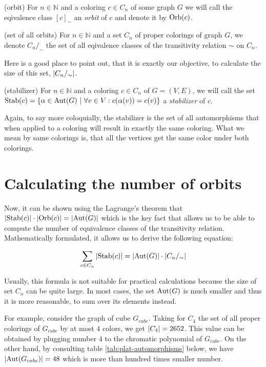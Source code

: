 \begin{defn}(orbit)
    For $n \in \mathbb{N}$ and a coloring $c \in C_n$ of some graph $G$ we will call the eqivalence class $[c]_{\sim}$ an \emph{orbit} of $c$ and denote it by $\operatorname{Orb}(c)$.
\end{defn}

\begin{defn}(set of all orbits)
    For $n \in \mathbb{N}$ and a set $C_n$ of proper colorings of graph $G$, we denote $C_n/_\sim$ the set of all eqivalence classes of the transitivity relation $\sim$ on $C_n$.
\end{defn}

Here is a good place to point out, that it is exactly our objective, to calculate the size of this set, $\left|{C_n/_\sim}\right|$.

\begin{defn}(stabilizer)
    For $n \in \mathbb{N}$ and a coloring $c \in C_n$ of $G=(V,E)$, we will call the set $\operatorname{Stab}(c) = \{ \alpha \in \operatorname{Aut}(G) \ | \ \forall v \in V : c(\alpha(v)) = c(v) \}$ a \emph{stabilizer} of $c$. 
\end{defn}

Again, to say more coloquially, the stabilizer is the set of all automorphisms that when applied to a coloring will result in exactly the same coloring. What we mean by same colorings is, that all the vertices get the same color under both colorings.

\section{Calculating the number of orbits}

Now, it can be shown using the Lagrange's theorem that $\left|{\operatorname{Stab}(c)}\right| \cdot \left|{\operatorname{Orb}(c)}\right| = \left|{\operatorname{Aut}(G)}\right|$ which is the key fact that allows us to be able to compute the number of equivalence classes of the transitivity relation. Mathematically formulated, it allows us to derive the following equation:

\begin{equation}\label{eqn:orbits-by-stab}
    \sum_{c\in C_n}\left|{\operatorname{Stab}(c)}\right| = \left|{\operatorname{Aut}(G)}\right| \cdot \left|{C_n/_\sim}\right| 
\end{equation}


Usually, this formula is not suitable for practical calculations because the size of set $C_n$ can be quite large. In most cases, the set $\operatorname{Aut}(G)$ is much smaller and thus it is more reasonable, to sum over its elements instead. 

For example, consider the graph of cube $G_{cube}$. Taking for $C_4$ the set of all proper colorings of $G_{cube}$ by at most $4$ colors, we get $\left|{C_4}\right| = 2652$. This value can be obtained by plugging number $4$ to the chromatic polynomial of $G_{cube}$. On the other hand, by consulting table \ref{tab:plat-automorphisms} below, we have $\left|{\operatorname{Aut}(G_{cube})}\right| = 48$ which is more than hundred times smaller number.

